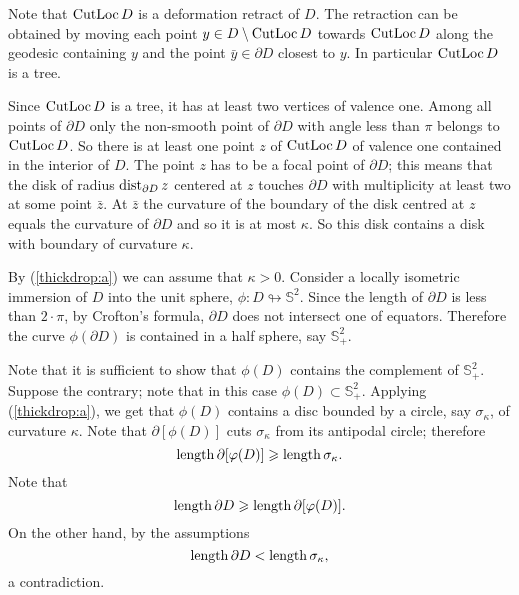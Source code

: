 \documentclass{compositio}
\begin{document}
Note that $\mathop{\rm CutLoc}\nolimits D$ is a
deformation retract of $D$.
The retraction can be obtained by moving each point $y\in D\setminus \mathop{\rm CutLoc}\nolimits D$ towards $\mathop{\rm CutLoc}\nolimits D$
along the geodesic containing $y$ and
the point $\bar y\in\partial D$ closest to $y$.
In particular $\mathop{\rm CutLoc}\nolimits D$ is a tree.


Since $\mathop{\rm CutLoc}\nolimits D$  is a tree, it has
at least two vertices of valence one.
Among all points of $\partial D$ only
the non-smooth point of $\partial D$ with angle less
than $\pi$ belongs to $\mathop{\rm CutLoc}\nolimits D$.
So there is at least one point $z$
of $\mathop{\rm CutLoc}\nolimits D$ of valence one
contained in the interior of $D$.
The point $z$ has to be a focal point of $\partial D$;
this means that
the disk of radius $\mathop{\rm dist}\nolimits_{\partial D}z$ centered at $z$ touches $\partial D$
with multiplicity at least two at some point $\bar z$.
At $\bar z$ the curvature of
the boundary of the disk centred at $z$ equals the curvature of
$\partial D$  and so it is at most $\kappa$. 
So this disk contains a disk with boundary of curvature $\kappa$.

By (\ref{thickdrop:a}) we can assume that $\kappa>0$.
Consider a locally isometric
immersion  of $D$ into the unit sphere, $\phi: D\looparrowright \mathbb{S}^2$.
Since the length of $\partial D$ is less than
$2{\cdot}\pi$, by Crofton's formula,  $\partial D$
does not intersect one of equators.
Therefore the curve $\phi(\partial D)$ is contained in a half sphere, say $\mathbb{S}^2_+$.

Note that
it is sufficient to show that $\phi(D)$ contains the complement of $\mathbb{S}^2_+$.
Suppose the contrary; note that in this case $\phi(D)\subset \mathbb{S}^2_+$.
Applying (\ref{thickdrop:a}),
we get that $\phi(D)$ contains a disc bounded by a circle,
say $\sigma_\kappa$, of curvature $\kappa$.
Note that $\partial[\phi(D)]$ cuts $\sigma_\kappa$ from its antipodal circle;
therefore
$$\mathop{\rm length}\nolimits \partial[\varphi(D)]\geqslant \mathop{\rm length}\nolimits \sigma_\kappa.$$
Note that
$$\mathop{\rm length}\nolimits\partial D\geqslant \mathop{\rm length}\nolimits \partial[\varphi(D)].$$
On the other hand, by the assumptions
$$\mathop{\rm length}\nolimits\partial D<\mathop{\rm length}\nolimits \sigma_\kappa,$$
a contradiction.
\qeds
\end{document}
